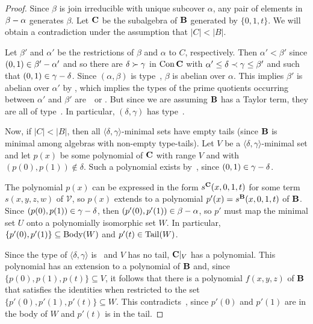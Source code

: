 \begin{proof}
Since $\beta$ is join irreducible with unique subcover $\alpha$, any
pair of elements in $\beta - \alpha$ generates $\beta$.
Let $\mathbf{C}$ be the subalgebra of $\mathbf{B}$ generated by $\{0,1,t\}$. 
We will obtain a contradiction under the assumption that $|C| < |B|$.

Let $\beta'$ and $\alpha'$ be the restrictions of $\beta$ and $\alpha $ to $C$,
respectively. Then $\alpha' < \beta'$ since $(0,1) \in
\beta'- \alpha'$ and so there are $\delta \succ \gamma$ in
$\operatorname{Con}{\mathbf{C}}$ with $\alpha' \le \delta \prec \gamma \le \beta'$ and
such that $(0,1) \in \gamma- \delta$.
Since $(\alpha,\beta)$ is type~\atyp, $\beta$ is abelian over $\alpha$.
This implies $\beta'$ is abelian over $\alpha'$ 
by \cite[Lemma 2.19(9)]{MR3076179},
which implies the
types of the prime quotients occurring between $\alpha'$ and $\beta'$
are~\utyp\ or \atyp.
But since we are assuming $\mathbf{B}$ has a Taylor term,
they are all of type~\atyp. 
In particular, $(\delta,\gamma)$ has type~\atyp.

Now, if $|C| < |B|$, then all 
$\langle \delta, \gamma \rangle$-minimal sets have empty tails
(since $\mathbf{B}$ is minimal among algebras with non-empty 
type-\atyp tails). 
Let $V$ be a $\langle \delta,\gamma \rangle$-minimal set and let 
$p(x)$ be some polynomial of $\mathbf{C}$ with range $V$ and with 
$(p(0) ,p(1))\notin \delta$. Such a polynomial exists 
by~\cite[Theorem~2.8]{HM:1988}, 
since $(0,1) \in \gamma- \delta$.

The polynomial $p(x)$ can be expressed in the form 
$s^{\mathbf{C}}(x,0,1,t)$ for some term $s(x,y,z,w)$ 
of $\mathcal V$, so $p(x)$ extends to a polynomial 
$p'(x) = s^{\mathbf{B}}(x,0,1,t)$ of $\mathbf{B}$.  Since $(p(0),
p(1)) \in \gamma- \delta$, then 
$(p'(0), p'(1)) \in \beta- \alpha$, so $p'$ must map the 
minimal set $U$ onto a polynomially isomorphic set $W$. In particular, 
$\{p'(0), p'(1)\} \subseteq \operatorname{Body} (W)$ and $p'(t) \in \operatorname{Tail} (W)$.

Since the type of $\langle \delta, \gamma \rangle$ is \atyp\ 
and $V$ has no tail,   
$\mathbf{C}|_V$ has a \malcev polynomial. %
This polynomial has an extension to a polynomial of $\mathbf{B}$ and, since 
$\{p(0), p(1),p(t)\} \subseteq V$, it follows that there is a polynomial
$f(x,y,z)$ of $\mathbf{B}$ that satisfies the \malcev identities when
restricted to the set $\{p'(0), p'(1), p'(t)\} \subseteq W$. This
contradicts~\cite[Lemma~4.26]{HM:1988}, since $p'(0)$ and $p'(1)$
are in the body of $W$ and $p'(t)$ is in the tail.
\end{proof}


